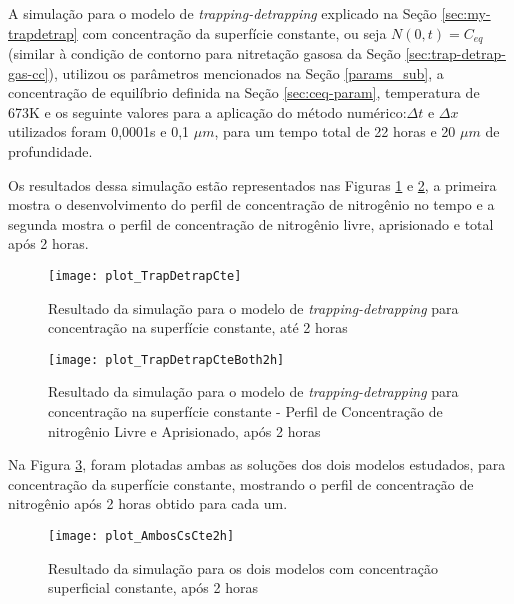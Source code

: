 \FloatBarrier


A simulação para o modelo de \textit{trapping-detrapping} explicado na Seção \ref{sec:my-trapdetrap} com concentração da superfície constante, ou seja $N(0,t)=C_{eq}$ (similar à condição de contorno para nitretação gasosa da Seção \ref{sec:trap-detrap-gas-cc}), utilizou os parâmetros mencionados na Seção \ref{params_sub}, a concentração de equilíbrio definida na Seção \ref{sec:ceq-param}, temperatura de 673K e os seguinte valores para a aplicação do método numérico:$\Delta t$ e $\Delta x$ utilizados foram 0,0001s e 0,1 $\mu m$, para um tempo total de 22 horas e 20 $\mu m$ de profundidade.

Os resultados dessa simulação estão representados nas Figuras \ref{fig:td-cscte1} e \ref{fig:td-cscte-both}, a primeira mostra o desenvolvimento do perfil de concentração de nitrogênio no tempo e a segunda mostra o perfil de concentração de nitrogênio livre, aprisionado e total após 2 horas.

\begin{figure}[ht]
\centering
	\caption{Resultado da simulação para o modelo de \textit{trapping-detrapping} para concentração na superfície constante, até 2 horas}
	\texttt{[image: plot\_TrapDetrapCte]}
	\label{fig:td-cscte1}
	\centering
\end{figure}


\begin{figure}[ht]
\centering
	\caption{Resultado da simulação para o modelo de \textit{trapping-detrapping} para concentração na superfície constante - Perfil de Concentração de nitrogênio Livre e Aprisionado, após 2 horas }
	\texttt{[image: plot\_TrapDetrapCteBoth2h]}
	\label{fig:td-cscte-both}
	\centering
\end{figure}

Na Figura \ref{fig:td-cscte-compara}, foram plotadas ambas as soluções dos dois modelos estudados, para concentração da superfície constante, mostrando o perfil de concentração de nitrogênio após 2 horas obtido para cada um.

\begin{figure}[ht]
\centering
	\caption{Resultado da simulação para os dois modelos com concentração superficial constante, após 2 horas }
	\texttt{[image: plot\_AmbosCsCte2h]}
	\label{fig:td-cscte-compara}
	\centering
\end{figure}
\FloatBarrier

